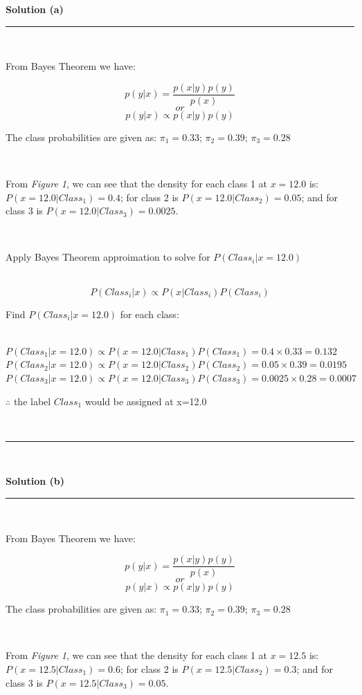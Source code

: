 \documentclass{article}
\begin{document}
\parbox{\textwidth}{\textbf{Solution (a)}}
\noindent\rule{\textwidth}{0.4pt}\\

\parbox{\textwidth}{From Bayes Theorem we have:}
$$p(y|x) = \frac{p(x|y)p(y)}{p(x)}$$
$$or$$
$$p(y|x) \propto p(x|y)p(y)$$

\parbox{\textwidth}{The class probabilities are given as: $\pi_1 = 0.33$; $\pi_2 = 0.39$; $\pi_3 = 0.28$}\\

\parbox{\textwidth}{From \textit{Figure 1}, we can see that the density for each class 1 at $x=12.0$ is: $P(x=12.0|Class_1) = 0.4$; for class 2 is $P(x=12.0|Class_2) = 0.05$; and for class 3 is $P(x=12.0|Class_3) = 0.0025$.}\\

\parbox{\textwidth}{Apply Bayes Theorem approimation to solve for $P(Class_i | x=12.0)$}\\

$$P(Class_i|x) \propto P(x|Class_i)P(Class_i)$$

\parbox{\textwidth}{Find $P(Class_i|x=12.0)$ for each class:}\\

$P(Class_1|x=12.0) \propto P(x=12.0|Class_1)P(Class_1) = 0.4 \times 0.33 = 0.132$\\

$P(Class_2|x=12.0) \propto P(x=12.0|Class_2)P(Class_2) = 0.05 \times 0.39 = 0.0195$\\

$P(Class_3|x=12.0) \propto P(x=12.0|Class_3)P(Class_3) = 0.0025 \times 0.28 = 0.0007$\\

\parbox{\textwidth}{$\therefore$ the label $Class_1$ would be assigned at x=12.0}\\

\noindent\rule{\textwidth}{0.4pt}\\

\parbox{\textwidth}{\textbf{Solution (b)}}
\noindent\rule{\textwidth}{0.4pt}\\

\parbox{\textwidth}{From Bayes Theorem we have:}
$$p(y|x) = \frac{p(x|y)p(y)}{p(x)}$$
$$or$$
$$p(y|x) \propto p(x|y)p(y)$$

\parbox{\textwidth}{The class probabilities are given as: $\pi_1 = 0.33$; $\pi_2 = 0.39$; $\pi_3 = 0.28$}\\

\parbox{\textwidth}{From \textit{Figure 1}, we can see that the density for each class 1 at $x=12.5$ is: $P(x=12.5|Class_1) = 0.6$; for class 2 is $P(x=12.5|Class_2) = 0.3$; and for class 3 is $P(x=12.5|Class_3) = 0.05$.}\\
\end{document}
